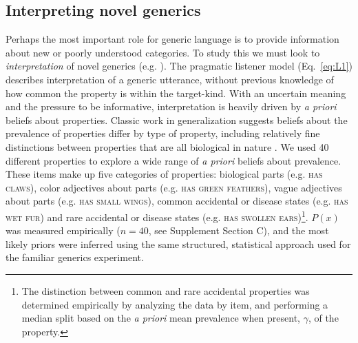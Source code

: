 \documentclass{pnastwo}
\begin{document}
\begin{article}
\subsection{Interpreting novel generics}



Perhaps the most important role for generic language is to provide information about new or poorly understood categories. 
To study this we must look to \emph{interpretation} of novel generics (e.g. \cite{Gelman2002, Cimpian2010}).
The pragmatic listener model (Eq.~\ref{eq:L1}) describes interpretation of a generic utterance, without previous knowledge of how common the property is within the target-kind. 
With an uncertain meaning and the pressure to be informative, interpretation is heavily driven by \emph{a priori} beliefs about properties. 
Classic work in generalization suggests beliefs about the prevalence of properties differ by type of property, including relatively fine distinctions between properties that are all biological in nature \cite{Nisbett1983}. 
We used 40 different properties to explore a wide range of \emph{a priori} beliefs about prevalence. 
These items make up five categories of properties: biological parts (e.g. \textsc{has claws}), color adjectives about parts (e.g. \textsc{has green feathers}), vague adjectives about parts (e.g. \textsc{has small wings}),  common accidental or disease states (e.g. \textsc{has wet fur}) and rare accidental or disease states (e.g. \textsc{has swollen ears})\footnote{The distinction between common and rare accidental properties was determined empirically by analyzing the data by item, and performing a median split based on the \emph{a priori} mean prevalence when present, $\gamma$, of the property.}.
$P(x)$ was measured empirically ($n=40$, see Supplement Section C), and the most likely priors were inferred using the same structured, statistical approach used for the familiar generics experiment.



\end{article}
\end{document}
